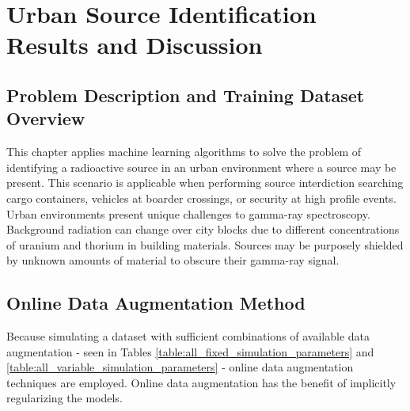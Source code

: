 \chapter{Urban Source Identification Results and Discussion}







\section{Problem Description and Training Dataset Overview}

This chapter applies machine learning algorithms to solve the problem of identifying a radioactive source in an urban environment where a source may be present. This scenario is applicable when performing source interdiction searching cargo containers, vehicles at boarder crossings, or security at high profile events. Urban environments present unique challenges to gamma-ray spectroscopy. Background radiation can change over city blocks due to different concentrations of uranium and thorium in building materials. Sources may be purposely shielded by unknown amounts of material to obscure their gamma-ray signal.





\section{Online Data Augmentation Method}

Because simulating a dataset with sufficient combinations of available data augmentation - seen in Tables \ref{table:all_fixed_simulation_parameters} and \ref{table:all_variable_simulation_parameters} - online data augmentation techniques are employed. Online data augmentation has the benefit of implicitly regularizing the models.

